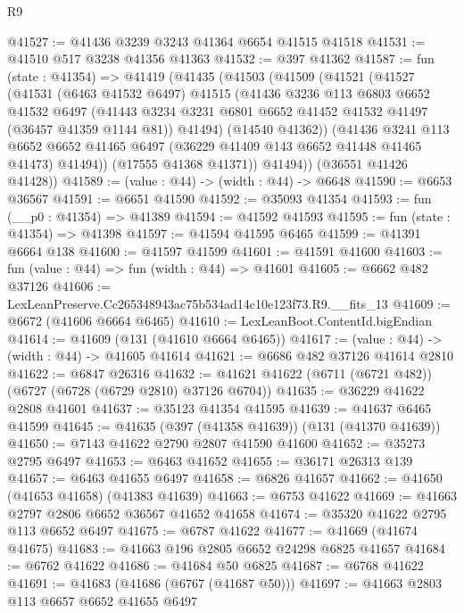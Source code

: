 \begin{lexlean}{R9}
\begin{coremodule}
@41527 := @41436 @3239 @3243 @41364 @6654 @41515 @41518
@41531 := @41510 @517 @3238 @41356 @41363
@41532 := @397 @41362
@41587 := fun (state : @41354) =>
  @41419
    (@41435
      (@41503
        (@41509
          (@41521
            (@41527
              (@41531
                (@6463 @41532 @6497)
                @41515
                (@41436
                  @3236
                  @113
                  @6803
                  @6652
                  @41532
                  @6497
                  (@41443 @3234 @3231 @6801 @6652 @41452 @41532 @41497 (@36457 @41359 @1144 @81))
                  @41494)
                (@14540 @41362))
              (@41436
                @3241
                @113
                @6652
                @6652
                @41465
                @6497
                (@36229 @41409 @143 @6652 @41448 @41465 @41473)
                @41494))
            (@17555 @41368 @41371))
          @41494))
      (@36551 @41426 @41428))
@41589 := (value : @44) -> (width : @44) -> @6648
@41590 := @6653 @36567
@41591 := @6651 @41590
@41592 := @35093 @41354
@41593 := fun (__p0 : @41354) => @41389
@41594 := @41592 @41593
@41595 := fun (state : @41354) => @41398
@41597 := @41594 @41595 @6465
@41599 := @41391 @6664 @138
@41600 := @41597 @41599
@41601 := @41591 @41600
@41603 := fun (value : @44) => fun (width : @44) => @41601
@41605 := @6662 @482 @37126
@41606 := LexLeanPreserve.Cc265348943ac75b534ad14c10e123f73.R9.__fits_13
@41609 := @6672 (@41606 @6664 @6465)
@41610 := LexLeanBoot.ContentId.bigEndian
@41614 := @41609 (@131 (@41610 @6664 @6465))
@41617 := (value : @44) -> (width : @44) -> @41605 @41614
@41621 := @6686 @482 @37126 @41614 @2810
@41622 := @6847 @26316
@41632 := @41621 @41622 (@6711 (@6721 @482)) (@6727 (@6728 (@6729 @2810) @37126 @6704))
@41635 := @36229 @41622 @2808 @41601
@41637 := @35123 @41354 @41595
@41639 := @41637 @6465 @41599
@41645 := @41635 (@397 (@41358 @41639)) (@131 (@41370 @41639))
@41650 := @7143 @41622 @2790 @2807 @41590 @41600
@41652 := @35273 @2795 @6497
@41653 := @6463 @41652
@41655 := @36171 @26313 @139
@41657 := @6463 @41655 @6497
@41658 := @6826 @41657
@41662 := @41650 (@41653 @41658) (@41383 @41639)
@41663 := @6753 @41622
@41669 := @41663 @2797 @2806 @6652 @36567 @41652 @41658
@41674 := @35320 @41622 @2795 @113 @6652 @6497
@41675 := @6787 @41622
@41677 := @41669 (@41674 @41675)
@41683 := @41663 @196 @2805 @6652 @24298 @6825 @41657
@41684 := @6762 @41622
@41686 := @41684 @50 @6825
@41687 := @6768 @41622
@41691 := @41683 (@41686 (@6767 (@41687 @50)))
@41697 := @41663 @2803 @113 @6657 @6652 @41655 @6497

\end{coremodule}
\end{lexlean}
